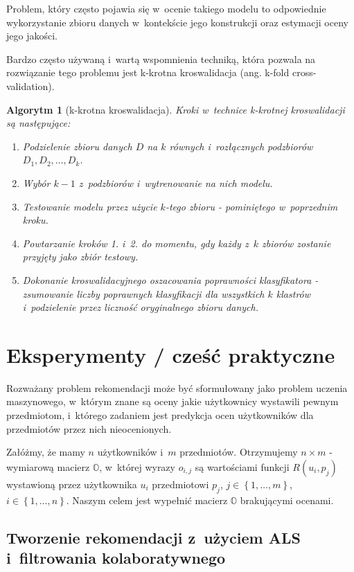 \documentclass[12pt,a4paper]{report}
\newtheorem{algorytm}[df]{Algorytm}
\newcommand{\set}[1]{\left\lbrace {#1} \right\rbrace}
\begin{document}
Problem, który często pojawia się w~ocenie takiego modelu to odpowiednie wykorzystanie zbioru danych w~kontekście jego konstrukcji oraz estymacji oceny jego jakości.

Bardzo często używaną i~wartą wspomnienia techniką, która pozwala na rozwiązanie tego problemu jest k-krotna kroswalidacja (ang. k-fold cross-validation).

\begin{algorytm}[k-krotna kroswalidacja{\citep[Sec 4.8.4]{edmia}}]
Kroki w~technice k-krotnej kroswalidacji są następujące:
\begin{enumerate}
\item Podzielenie zbioru danych $\mathit{D}$ na $k$ równych i~rozłącznych podzbiorów $\mathit{D}_1, \mathit{D}_2, \ldots, \mathit{D}_k$.
\item Wybór $k-1$ z~podzbiorów i~wytrenowanie na nich modelu.
\item Testowanie modelu przez użycie $k$-tego zbioru - pominiętego w~poprzednim kroku.
\item Powtarzanie kroków 1. i~2. do momentu, gdy każdy z~$k$ zbiorów zostanie przyjęty jako zbiór testowy.
\item Dokonanie kroswalidacyjnego oszacowania poprawności klasyfikatora - zsumowanie liczby poprawnych klasyfikacji dla wszystkich $k$ klastrów i~podzielenie przez liczność oryginalnego zbioru danych. 

\end{enumerate}

\end{algorytm}

\chapter{Eksperymenty / cześć praktyczne}

Rozważany problem rekomendacji może być sformułowany jako problem uczenia maszynowego, w~którym znane są oceny jakie użytkownicy wystawili pewnym przedmiotom, i~którego zadaniem jest predykcja ocen użytkowników dla przedmiotów przez nich nieocenionych. 

Załóżmy, że mamy $n$ użytkowników i~$m$ przedmiotów. Otrzymujemy $n \times m$ - wymiarową macierz $\mathbb{O}$, w~której wyrazy $o_{i,j}$ są wartościami funkcji $R(u_i,p_j)$ wystawioną przez użytkownika $u_i$ przedmiotowi $p_j$, $j \in \set{1, \ldots, m}$, $i \in \set{1, \ldots, n}$. Naszym celem jest wypełnić macierz $\mathbb{O}$ brakującymi ocenami. 


\section{Tworzenie rekomendacji z~użyciem ALS i~filtrowania kolaboratywnego}
\end{document}
